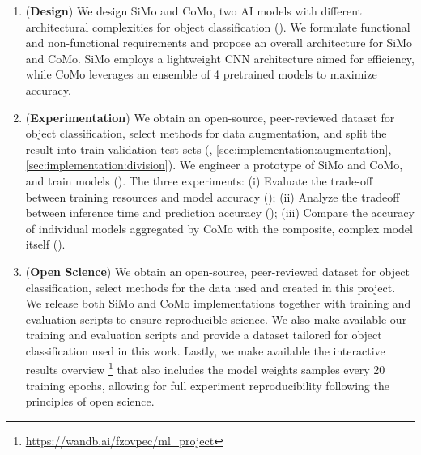 \begin{enumerate}[label=\textbf{C\arabic*}]
\item \label{introduction:c1} (\textbf{Design}) We design SiMo and CoMo, two AI models with different architectural complexities for object classification (). We formulate functional and non-functional requirements and propose an overall architecture for SiMo and CoMo. SiMo employs a lightweight CNN architecture aimed for efficiency, while CoMo leverages an ensemble of 4 pretrained models to maximize accuracy.

\item \label{introduction:c2} (\textbf{Experimentation}) 
We obtain an open-source, peer-reviewed dataset for object classification, select methods for data augmentation, and split the result into train-validation-test sets (, \ref{sec:implementation:augmentation}, \ref{sec:implementation:division}). We engineer a prototype of SiMo and CoMo, and train models (). The three experiments: (i) Evaluate the trade-off between training resources and model accuracy (); (ii) Analyze the tradeoff between inference time and prediction accuracy (); (iii) Compare the accuracy of individual models aggregated by CoMo with the composite, complex model itself (). 

\item \label{introduction:c3} (\textbf{Open Science}) 
We obtain an open-source, peer-reviewed dataset for object classification, select methods for the data used and created in this project. We release both SiMo and CoMo implementations together with training and evaluation scripts to ensure reproducible science. We also make available our training and evaluation scripts and provide a dataset tailored for object classification used in this work. Lastly, we make available the interactive results overview \footnote{\url{https://wandb.ai/fzovpec/ml_project}} that also includes the model weights samples every 20 training epochs, allowing for full experiment reproducibility following the principles of open science.


\end{enumerate}




